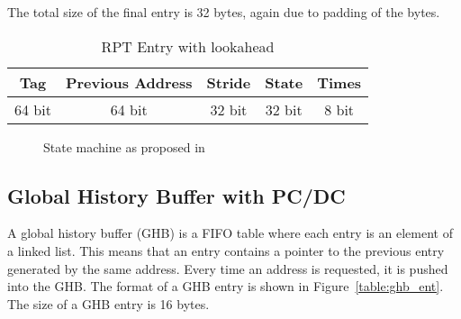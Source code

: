 The total size of the final entry is 32 bytes, again due to padding of
the bytes.

\begin{table}[h]
  \centering
  \begin{tabular}{| c | c | c | c | c |}
    \hline
    Tag & Previous Address & Stride & State & Times \\ \hline
    64 bit & 64 bit & 32 bit & 32 bit & 8 bit \\ \hline
  \end{tabular}
  \caption{RPT Entry with lookahead}
  \label{table:entry_la}
\end{table}

\begin{figure}[h!]
\begin{center}
\caption{State machine as proposed in~\cite{chen_baer_1995}}
\label{figure:statemachine}
\end{center}
\end{figure}

\subsection{Global History Buffer with PC/DC}

A global history buffer (GHB) is a FIFO table where each entry is an
element of a linked list. This means that an entry contains a pointer
to the previous entry generated by the same address. Every time an
address is requested, it is pushed into the GHB. The format of a GHB
entry is shown in Figure~\ref{table:ghb_ent}. The size of a GHB entry
is 16 bytes.

